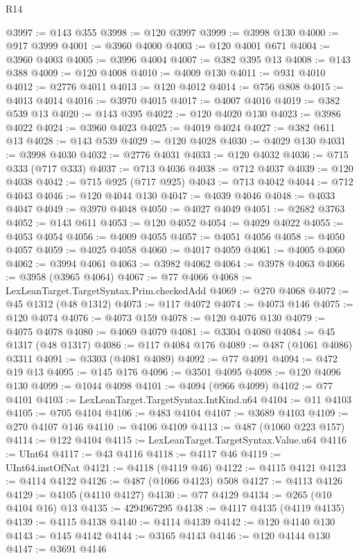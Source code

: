 \begin{lexlean}{R14}
\begin{coremodule}
{{{{{{{{{{{{{{{{{{{{{{{{{{{{{{{{{{{{{{{{{{{{{{{{{{{{{{{{{{{{{{{{{{{{{{{{{{{{{{{{{{{{{{{{{{{{{{{{{{{{{{{{{{@3997 := @143 @355
@3998 := @120 @3997
@3999 := @3998 @130
@4000 := @917 @3999
@4001 := @3960 @4000
@4003 := @120 @4001 @671
@4004 := @3960 @4003
@4005 := @3996 @4004
@4007 := @382 @395 @13
@4008 := @143 @388
@4009 := @120 @4008
@4010 := @4009 @130
@4011 := @931 @4010
@4012 := @2776 @4011
@4013 := @120 @4012
@4014 := @756 @808
@4015 := @4013 @4014
@4016 := @3970 @4015
@4017 := @4007 @4016
@4019 := @382 @539 @13
@4020 := @143 @395
@4022 := @120 @4020 @130
@4023 := @3986 @4022
@4024 := @3960 @4023
@4025 := @4019 @4024
@4027 := @382 @611 @13
@4028 := @143 @539
@4029 := @120 @4028
@4030 := @4029 @130
@4031 := @3998 @4030
@4032 := @2776 @4031
@4033 := @120 @4032
@4036 := @715 @333 (@717 @333)
@4037 := @713 @4036
@4038 := @712 @4037
@4039 := @120 @4038
@4042 := @715 @925 (@717 @925)
@4043 := @713 @4042
@4044 := @712 @4043
@4046 := @120 @4044 @130
@4047 := @4039 @4046
@4048 := @4033 @4047
@4049 := @3970 @4048
@4050 := @4027 @4049
@4051 := @2682 @3763
@4052 := @143 @611
@4053 := @120 @4052
@4054 := @4029 @4022
@4055 := @4053 @4054
@4056 := @4009 @4055
@4057 := @4051 @4056
@4058 := @4050 @4057
@4059 := @4025 @4058
@4060 := @4017 @4059
@4061 := @4005 @4060
@4062 := @3994 @4061
@4063 := @3982 @4062
@4064 := @3978 @4063
@4066 := @3958 (@3965 @4064)
@4067 := @77 @4066
@4068 := LexLeanTarget.TargetSyntax.Prim.checkedAdd
@4069 := @270 @4068
@4072 := @45 @1312 (@48 @1312)
@4073 := @117 @4072
@4074 := @4073 @146
@4075 := @120 @4074
@4076 := @4073 @159
@4078 := @120 @4076 @130
@4079 := @4075 @4078
@4080 := @4069 @4079
@4081 := @3304 @4080
@4084 := @45 @1317 (@48 @1317)
@4086 := @117 @4084 @176
@4089 := @487 (@1061 @4086) @3311
@4091 := @3303 (@4081 @4089)
@4092 := @77 @4091
@4094 := @472 @19 @13
@4095 := @145 @176
@4096 := @3501 @4095
@4098 := @120 @4096 @130
@4099 := @1044 @4098
@4101 := @4094 (@966 @4099)
@4102 := @77 @4101
@4103 := LexLeanTarget.TargetSyntax.IntKind.u64
@4104 := @11 @4103
@4105 := @705 @4104
@4106 := @483 @4104
@4107 := @3689 @4103
@4109 := @270 @4107 @146
@4110 := @4106 @4109
@4113 := @487 (@1060 @223 @157)
@4114 := @122 @4104
@4115 := LexLeanTarget.TargetSyntax.Value.u64
@4116 := UInt64
@4117 := @43 @4116
@4118 := @4117 @46
@4119 := UInt64.instOfNat
@4121 := @4118 (@4119 @46)
@4122 := @4115 @4121
@4123 := @4114 @4122
@4126 := @487 (@1066 @4123) @508
@4127 := @4113 @4126
@4129 := @4105 (@4110 @4127)
@4130 := @77 @4129
@4134 := @265 (@10 @4104 @16) @13
@4135 := 4294967295
@4138 := @4117 @4135 (@4119 @4135)
@4139 := @4115 @4138
@4140 := @4114 @4139
@4142 := @120 @4140 @130
@4143 := @145 @4142
@4144 := @3165 @4143
@4146 := @120 @4144 @130
@4147 := @3691 @4146
}}}}}}}}}}}}}}}}}}}}}}}}}}}}}}}}}}}}}}}}}}}}}}}}}}}}}}}}}}}}}}}}}}}}}}}}}}}}}}}}}}}}}}}}}}}}}}}}}}}}}}}}}}
\end{coremodule}
\end{lexlean}
